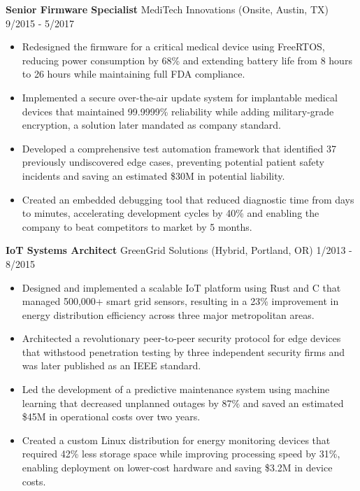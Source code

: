 \documentclass[11pt]{article}
\begin{document}
\noindent\textbf{Senior Firmware Specialist} \textperiodcentered MediTech Innovations (Onsite, Austin, TX) \hfill 9/2015 - 5/2017

\begin{itemize}[label=›, noitemsep, topsep=0pt, leftmargin=1em]
	\item Redesigned the firmware for a critical medical device using FreeRTOS, reducing power consumption by 68\% and extending battery life from 8 hours to 26 hours while maintaining full FDA compliance.
	\item Implemented a secure over-the-air update system for implantable medical devices that maintained 99.9999\% reliability while adding military-grade encryption, a solution later mandated as company standard.
	\item Developed a comprehensive test automation framework that identified 37 previously undiscovered edge cases, preventing potential patient safety incidents and saving an estimated \$30M in potential liability.
	\item Created an embedded debugging tool that reduced diagnostic time from days to minutes, accelerating development cycles by 40\% and enabling the company to beat competitors to market by 5 months.
\end{itemize}

\noindent\textbf{IoT Systems Architect} \textperiodcentered GreenGrid Solutions (Hybrid, Portland, OR) \hfill 1/2013 - 8/2015

\begin{itemize}[label=›, noitemsep, topsep=0pt, leftmargin=1em]
	\item Designed and implemented a scalable IoT platform using Rust and C that managed 500,000+ smart grid sensors, resulting in a 23\% improvement in energy distribution efficiency across three major metropolitan areas.
	\item Architected a revolutionary peer-to-peer security protocol for edge devices that withstood penetration testing by three independent security firms and was later published as an IEEE standard.
	\item Led the development of a predictive maintenance system using machine learning that decreased unplanned outages by 87\% and saved an estimated \$45M in operational costs over two years.
	\item Created a custom Linux distribution for energy monitoring devices that required 42\% less storage space while improving processing speed by 31\%, enabling deployment on lower-cost hardware and saving \$3.2M in device costs.
\end{itemize}
\end{document}
